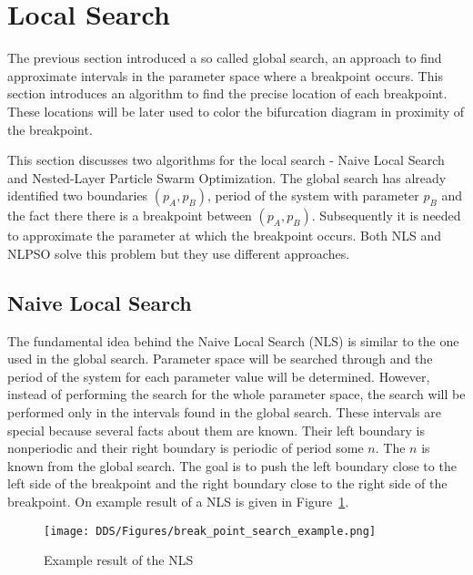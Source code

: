 \section{Local Search}
The previous section introduced a so called global search, an approach to find approximate intervals in the parameter space where a breakpoint occurs.
This section introduces an algorithm to find the precise location of each breakpoint.
These locations will be later used to color the bifurcation diagram in proximity of the breakpoint.
\par
This section discusses two algorithms for the local search - Naive Local Search and Nested-Layer Particle Swarm Optimization.
The global search has already identified two boundaries $(p_A, p_B)$, period of the system with parameter $p_B$ and the fact there there is a breakpoint between $(p_A, p_B)$.
Subsequently it is needed to approximate the parameter at which the breakpoint occurs.
Both NLS and NLPSO solve this problem but they use different approaches.

\subsection{Naive Local Search}
The fundamental idea behind the Naive Local Search (NLS) is similar to the one used in the global search.
Parameter space will be searched through and the period of the system for each parameter value will be determined.
However, instead of performing the search for the whole parameter space, the search will be performed only in the intervals found in the global search.
These intervals are special because several facts about them are known.
Their left boundary is nonperiodic and their right boundary is periodic of period some $n$.
The $n$ is known from the global search.
The goal is to push the left boundary close to the left side of the breakpoint and the right boundary close to the right side of the breakpoint.
On example result of a NLS is given in Figure~\ref{fig:break_point_search_example}.

\begin{figure}[!h]
    \centering
    \texttt{[image: DDS/Figures/break\_point\_search\_example.png]}
    \caption{Example result of the NLS}
    \label{fig:break_point_search_example}
\end{figure}



